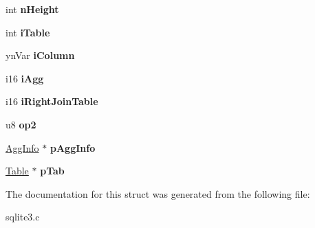 \begin{DoxyCompactItemize}
\begin{tabbing}
\end{tabbing}\item 
int {\bfseries n\+Height}\hypertarget{structExpr_a5a893ea309f801f23404e7e5ac02732b}{}\label{structExpr_a5a893ea309f801f23404e7e5ac02732b}

\item 
int {\bfseries i\+Table}\hypertarget{structExpr_af8e273f4d7d173bfb5996ed09054611c}{}\label{structExpr_af8e273f4d7d173bfb5996ed09054611c}

\item 
yn\+Var {\bfseries i\+Column}\hypertarget{structExpr_ad19251a8eb6db3cf0bdffe0dcb07eeba}{}\label{structExpr_ad19251a8eb6db3cf0bdffe0dcb07eeba}

\item 
i16 {\bfseries i\+Agg}\hypertarget{structExpr_a9fe0ed6360b0a4cf5b67ab8def922033}{}\label{structExpr_a9fe0ed6360b0a4cf5b67ab8def922033}

\item 
i16 {\bfseries i\+Right\+Join\+Table}\hypertarget{structExpr_aa49b76f3628a7bf2b0997c33461cc651}{}\label{structExpr_aa49b76f3628a7bf2b0997c33461cc651}

\item 
u8 {\bfseries op2}\hypertarget{structExpr_a0eacba0a2a6977e434b096b1cb9d5b9e}{}\label{structExpr_a0eacba0a2a6977e434b096b1cb9d5b9e}

\item 
\hyperlink{structAggInfo}{Agg\+Info} $\ast$ {\bfseries p\+Agg\+Info}\hypertarget{structExpr_a4fde82477256ee85f3a906263549082a}{}\label{structExpr_a4fde82477256ee85f3a906263549082a}

\item 
\hyperlink{structTable}{Table} $\ast$ {\bfseries p\+Tab}\hypertarget{structExpr_a27c8824b41d853eeeebe61cf3ac1ae5a}{}\label{structExpr_a27c8824b41d853eeeebe61cf3ac1ae5a}

\end{DoxyCompactItemize}


The documentation for this struct was generated from the following file\+:\begin{DoxyCompactItemize}
\item 
sqlite3.\+c\end{DoxyCompactItemize}
